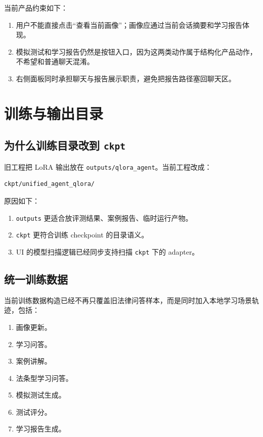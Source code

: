 \documentclass[12pt]{ctexart}
\begin{document}
当前产品约束如下：

\begin{enumerate}
  \item 用户不能直接点击“查看当前画像”；画像应通过当前会话摘要和学习报告体现。
  \item 模拟测试和学习报告仍然是按钮入口，因为这两类动作属于结构化产品动作，不希望和普通聊天混淆。
  \item 右侧面板同时承担聊天与报告展示职责，避免把报告路径塞回聊天区。
\end{enumerate}

\section{训练与输出目录}

\subsection{为什么训练目录改到 \texttt{ckpt}}

旧工程把 LoRA 输出放在 \texttt{outputs/qlora\_agent}。当前工程改成：

\begin{lstlisting}[language=bash]
ckpt/unified_agent_qlora/
\end{lstlisting}

原因如下：

\begin{enumerate}
  \item \texttt{outputs} 更适合放评测结果、案例报告、临时运行产物。
  \item \texttt{ckpt} 更符合训练 checkpoint 的目录语义。
  \item UI 的模型扫描逻辑已经同步支持扫描 \texttt{ckpt} 下的 adapter。
\end{enumerate}

\subsection{统一训练数据}

当前训练数据构造已经不再只覆盖旧法律问答样本，而是同时加入本地学习场景轨迹，包括：

\begin{enumerate}
  \item 画像更新。
  \item 学习问答。
  \item 案例讲解。
  \item 法条型学习问答。
  \item 模拟测试生成。
  \item 测试评分。
  \item 学习报告生成。
\end{enumerate}
\end{document}
